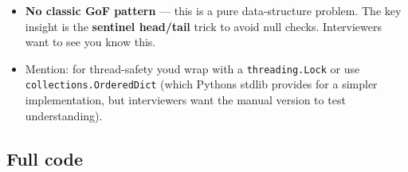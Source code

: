 \documentclass[11pt]{article}
\providecommand{\tightlist}{\setlength{\itemsep}{1pt}\setlength{\parskip}{0pt}}
\begin{document}
\begin{itemize}
\tightlist
\item
  \textbf{No classic GoF pattern} --- this is a pure data-structure problem. The key insight is the \textbf{sentinel head/tail} trick to avoid null checks. Interviewers want to see you know this.
\item
  Mention: for thread-safety you\textquotesingle d wrap with a \texttt{threading.Lock} or use \texttt{collections.OrderedDict} (which Python\textquotesingle s stdlib provides for a simpler implementation, but interviewers want the manual version to test understanding).
\end{itemize}

\subsection{Full code}\label{full-code}

\end{document}
